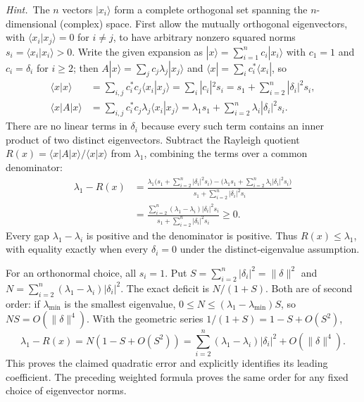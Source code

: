 \emph{Hint.}~The $n$ vectors $|x_{i}\rangle$ form a complete orthogonal set
spanning the $n$-dimensional (complex) space.
\solution
First allow the mutually orthogonal eigenvectors, with
$\langle x_i|x_j\rangle=0$ for $i\ne j$, to have arbitrary nonzero
squared norms $s_i=\langle x_i|x_i\rangle>0$. Write the given expansion as
$|x\rangle=\sum_{i=1}^nc_i|x_i\rangle$ with $c_1=1$ and $c_i=\delta_i$
for $i\ge2$; then $A|x\rangle=\sum_jc_j\lambda_j|x_j\rangle$ and
$\langle x|=\sum_ic_i^*\langle x_i|$, so
\begin{align*}
\langle x|x\rangle
&=\sum_{i,j}c_i^*c_j\langle x_i|x_j\rangle
=\sum_i|c_i|^2s_i
=s_1+\sum_{i=2}^n|\delta_i|^2s_i,\\
\langle x|A|x\rangle
&=\sum_{i,j}c_i^*c_j\lambda_j\langle x_i|x_j\rangle
=\lambda_1s_1+\sum_{i=2}^n\lambda_i|\delta_i|^2s_i.
\end{align*}
There are no linear terms in $\delta_i$ because every such term contains
an inner product of two distinct eigenvectors. Subtract the Rayleigh
quotient $R(x)=\langle x|A|x\rangle/\langle x|x\rangle$ from
$\lambda_1$, combining the terms over a common denominator:
\begin{align*}
\lambda_1-R(x)
&=\frac{\lambda_1\bigl(s_1+\sum_{i=2}^n|\delta_i|^2s_i\bigr)
 -\bigl(\lambda_1s_1+\sum_{i=2}^n\lambda_i|\delta_i|^2s_i\bigr)}
 {s_1+\sum_{i=2}^n|\delta_i|^2s_i}\\
&=\boxed{\frac{\sum_{i=2}^n(\lambda_1-\lambda_i)|\delta_i|^2s_i}
 {s_1+\sum_{i=2}^n|\delta_i|^2s_i}}\ge0.
\end{align*}
Every gap $\lambda_1-\lambda_i$ is positive and the denominator is
positive. Thus $R(x)\le\lambda_1$, with equality exactly when every
$\delta_i=0$ under the distinct-eigenvalue assumption.

For an orthonormal choice, all $s_i=1$. Put
$S=\sum_{i=2}^n|\delta_i|^2=\|\delta\|^2$ and
$N=\sum_{i=2}^n(\lambda_1-\lambda_i)|\delta_i|^2$. The exact deficit is
$N/(1+S)$. Both are of second order: if $\lambda_{\min}$ is the
smallest eigenvalue, $0\le N\le(\lambda_1-\lambda_{\min})S$, so
$NS=O(\|\delta\|^4)$. With the geometric series
$1/(1+S)=1-S+O(S^2)$,
\[
\lambda_1-R(x)=N(1-S+O(S^2))
=\sum_{i=2}^n(\lambda_1-\lambda_i)|\delta_i|^2
  +O(\|\delta\|^4).
\]
This proves the claimed quadratic error and explicitly identifies its
leading coefficient. The preceding weighted formula proves the same
order for any fixed choice of eigenvector norms.


